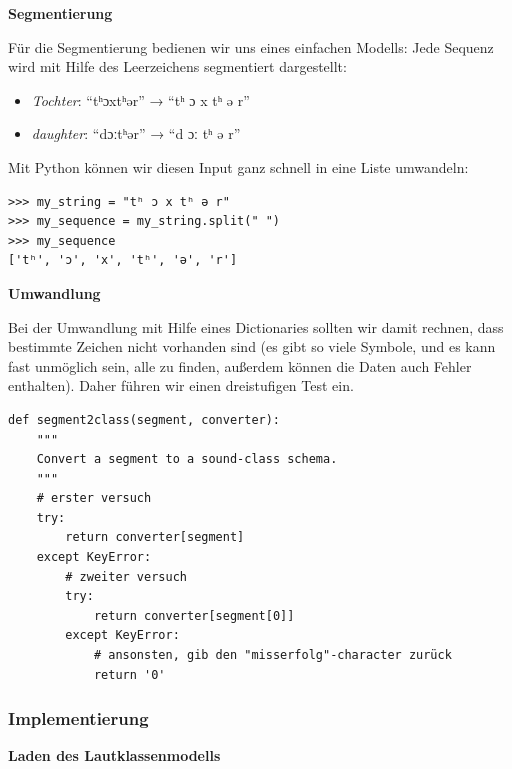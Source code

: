 \vspace{0.5cm}\par\noindent\textbf{Segmentierung}\vspace{0.5cm}

Für die Segmentierung bedienen wir uns eines einfachen Modells: Jede
Sequenz wird mit Hilfe des Leerzeichens segmentiert dargestellt:

\begin{itemize}
\itemsep1pt\parskip0pt
\item
  \emph{Tochter}: ``tʰɔxtʰər'' → ``tʰ ɔ x tʰ ə r''
\item
  \emph{daughter}: ``dɔːtʰər'' → ``d ɔː tʰ ə r''
\end{itemize}

Mit Python können wir diesen Input ganz schnell in eine Liste umwandeln:

\begin{verbatim}
>>> my_string = "tʰ ɔ x tʰ ə r"
>>> my_sequence = my_string.split(" ")
>>> my_sequence
['tʰ', 'ɔ', 'x', 'tʰ', 'ə', 'r']
\end{verbatim}




\vspace{0.5cm}\par\noindent\textbf{Umwandlung}\vspace{0.5cm}

Bei der Umwandlung mit Hilfe eines Dictionaries sollten wir damit
rechnen, dass bestimmte Zeichen nicht vorhanden sind (es gibt so viele
Symbole, und es kann fast unmöglich sein, alle zu finden, außerdem
können die Daten auch Fehler enthalten). Daher führen wir einen
dreistufigen Test ein.

\begin{verbatim}
def segment2class(segment, converter):
    """
    Convert a segment to a sound-class schema.
    """
    # erster versuch
    try:
        return converter[segment]
    except KeyError:
        # zweiter versuch
        try:
            return converter[segment[0]]
        except KeyError:
            # ansonsten, gib den "misserfolg"-character zurück
            return '0' 
\end{verbatim}



\subsubsection{Implementierung}

\vspace{0.5cm}\par\noindent\textbf{Laden des Lautklassenmodells}\vspace{0.5cm}

